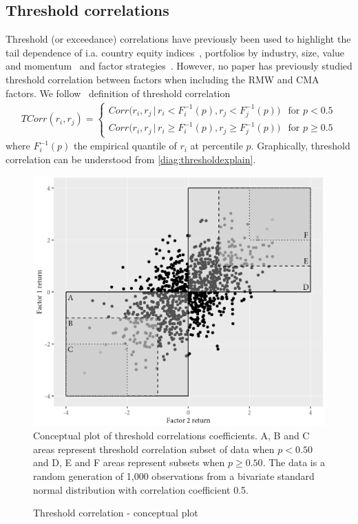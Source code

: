 \subsection{Threshold correlations}
Threshold (or exceedance) correlations have previously been used to highlight the tail dependence of i.a. country equity indices~\autocite{LonginSolnik2001}, portfolios by industry, size, value and momentum~\autocite{AngChen2002} and factor strategies~\autocite{ChristoffersenLanglois2013}. However, no paper has previously studied threshold correlation between factors when including the RMW and CMA factors. We follow~\textcite{ChristoffersenLanglois2013} definition of threshold correlation
\begin{align}
    TCorr(r_i, r_j) = 
    \begin{cases} 
        Corr\Big(r_i, r_j \,|\, r_i < F_i^{-1}(p), r_j < F_j^{-1}(p)\Big)  & \text{for } p < 0.5 \\
        Corr\Big(r_i, r_j \,|\, r_i \geq F_i^{-1}(p), r_j \geq F_j^{-1}(p)\Big)  & \text{for } p \geq 0.5
    \end{cases}
\end{align}
where $F_i^{-1}(p)$ the empirical quantile of $r_i$ at percentile $p$. Graphically, threshold correlation can be understood from \autoref{diag:thresholdexplain}. 
\begin{figure}[H]
  \caption{Threshold correlation - conceptual plot}
  \label{diag:thresholdexplain}
  \centering
  \begin{minipage}{\textwidth}
  \includegraphics[scale=1]{graphics/threshold_explain.png}  
  \vspace{3mm}
  \footnotesize
  Conceptual plot of threshold correlations coefficients. A, B and C areas represent threshold correlation subset of data when $p<0.50$ and D, E and F areas represent subsets when $p\geq0.50$. The data is a random generation of 1,000 observations from a bivariate standard normal distribution with correlation coefficient 0.5.
  \end{minipage}
\end{figure}
